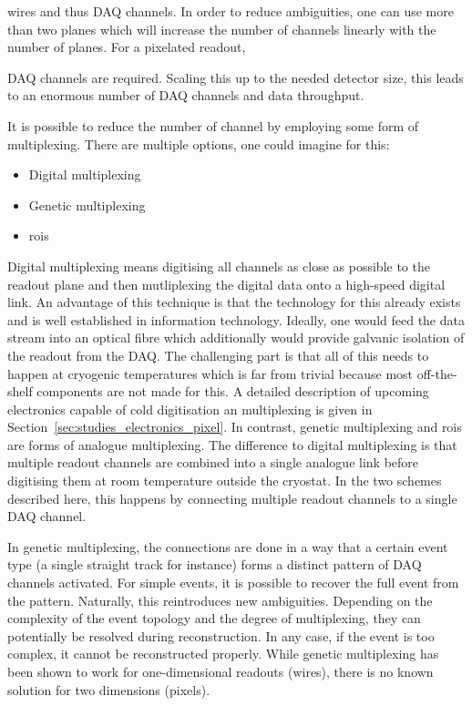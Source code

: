 wires and thus DAQ channels.
In order to reduce ambiguities, one can use more than two planes which will increase the number of channels linearly with the number of planes.
For a pixelated readout,


DAQ channels are required.
Scaling this up to the needed detector size, this leads to an enormous number of DAQ channels and data throughput.

It is possible to reduce the number of channel by employing some form of multiplexing.
There are multiple options, one could imagine for this:
\begin{itemize}
	\item Digital multiplexing
	\item Genetic multiplexing
	\item \glspl{roi}
\end{itemize}

Digital multiplexing means digitising all channels as close as possible to the readout plane and then mutliplexing the digital data onto a high-speed digital link.
An advantage of this technique is that the technology for this already exists and is well established in information technology.
Ideally, one would feed the data stream into an optical fibre which additionally would provide galvanic isolation of the readout from the DAQ.
The challenging part is that all of this needs to happen at cryogenic temperatures which is far from trivial because most off-the-shelf components are not made for this.
A detailed description of upcoming electronics capable of cold digitisation an multiplexing is given in Section~\ref{sec:studies_electronics_pixel}.
In contrast, genetic multiplexing and \glspl{roi} are forms of analogue multiplexing.
The difference to digital multiplexing is that multiple readout channels are combined into a single analogue link before digitising them at room temperature outside the cryostat.
In the two schemes described here, this happens by connecting multiple readout channels to a single DAQ channel.

In genetic multiplexing, the connections are done in a way that a certain event type (a single straight track for instance) forms a distinct pattern of DAQ channels activated.
For simple events, it is possible to recover the full event from the pattern.
Naturally, this reintroduces new ambiguities.
Depending on the complexity of the event topology and the degree of multiplexing, they can potentially be resolved during reconstruction.
In any case, if the event is too complex, it cannot be reconstructed properly.
While genetic multiplexing has been shown to work for one-dimensional readouts (wires), there is no known solution for two dimensions (pixels).

